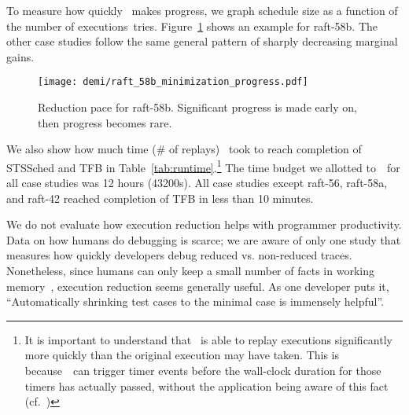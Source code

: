 
 To measure how quickly \sys~makes
progress, we graph schedule size as a function of the number of
executions~\sys tries.
Figure~\ref{fig:progress} shows an example for
raft-58b. The other case studies follow the same general pattern of sharply decreasing
marginal gains.

\begin{figure}[tb]
    \centering
    \texttt{[image: demi/raft\_58b\_minimization\_progress.pdf]}
    \caption{\label{fig:progress} Reduction pace for raft-58b. Significant progress is made early on, then progress becomes rare.}
\end{figure}


We also show how much time (\# of replays) \sys~took to reach completion of
STSSched and TFB in Table~\ref{tab:runtime}.\footnote{It is important
to understand that \sys~is able to replay executions significantly more quickly
than the original execution may have taken. This is because~\sys~can trigger timer events before the wall-clock duration for
those timers has actually passed, without the application being aware of this
fact (cf.~\cite{Gupta06toinfinity})} The time budget we allotted to~\sys~for all case studies was 12 hours (43200s).
All case studies except raft-56, raft-58a, and raft-42 reached completion of TFB in less than 10
minutes.

 We do not evaluate how execution
reduction helps
with programmer productivity. Data on how humans do debugging is scarce; we
are aware of only one study that measures how
quickly developers debug reduced vs. non-reduced traces\cite{fse_web_ddmin}.
Nonetheless, since humans can only keep a small number of facts in working
memory~\cite{miller56seven}, execution reduction seems generally useful. As one
developer
puts it,
``Automatically shrinking test cases to the
minimal case is immensely helpful''\cite{riak_quote}.

